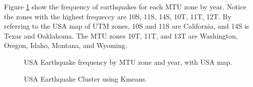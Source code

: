 \documentclass{article}
\begin{document}
Figure \ref{quakesbyutm} show the frequency of earthquakes for each MTU zone by year.
Notice the zones with the highest frequeccy are 10S, 11S, 14S, 10T, 11T, 12T. By referring to the USA map of UTM zones, 10S and 11S are California, and 14S is Texas and Oaklahoma.
The MTU zones 10T, 11T, and 13T are Washington, Oregon, Idaho, Montana, and Wyoming.

\begin{figure}
\begin{center}
\caption{USA Earthquake frequency by MTU zone and year,  with USA map.} \label{quakesbyutm}
\end{center}
\end{figure}


\begin{figure}
\begin{center}
\caption{USA Earthquake Cluster using Kmeans.} \label{quakecluster}
\end{center}
\end{figure}
\end{document}
